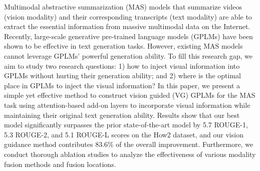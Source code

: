 Multimodal abstractive summarization (MAS) models that summarize videos (vision modality) and their corresponding transcripts (text modality) are able to extract the essential information from massive multimodal data on the Internet. Recently, large-scale generative pre-trained language models (GPLMs) have been shown to be effective in text generation tasks. However, existing MAS models cannot leverage GPLMs' powerful generation ability. To fill this research gap, we aim to study two research questions: 1) how to inject visual information into GPLMs without hurting their generation ability; and 2) where is the optimal place in GPLMs to inject the visual information? In this paper, we present a simple yet effective method to construct vision guided (VG) GPLMs for the MAS task using attention-based add-on layers to incorporate visual information while maintaining their original text generation ability. Results show that our best model significantly surpasses the prior state-of-the-art model by 5.7 ROUGE-1, 5.3 ROUGE-2, and 5.1 ROUGE-L scores on the How2 dataset, and our vision guidance method contributes 83.6\% of the overall improvement. Furthermore, we conduct thorough ablation studies to analyze the effectiveness of various modality fusion methods and fusion locations.
